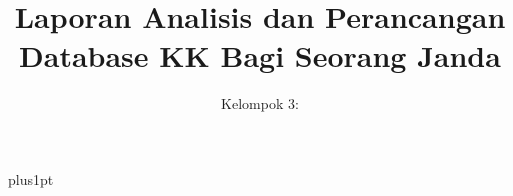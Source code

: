 \documentclass[12pt]{ociamthesis}
\title{Laporan Analisis dan Perancangan Database KK Bagi Seorang Janda\\[1ex]  }
\author{ Kelompok 3:\\[2ex] }
\begin{document}
\baselineskip=18pt plus1pt

\setcounter{secnumdepth}{3}
\setcounter{tocdepth}{3}
\maketitle

\begin{romanpages}
\tableofcontents
\listoffigures
\end{romanpages}




\end{document}

